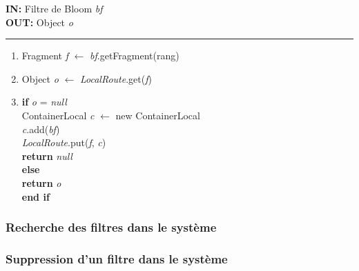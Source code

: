 \documentclass[a4paper,11pt]{report}
\begin{document}
\begin{flushleft}
	\begin{framed}
		\textbf{IN:} Filtre de Bloom \textit{bf}\\
		\textbf{OUT:} Object \textit{o}\\
		\noindent\rule{\linewidth}{0.5pt}

		\begin{enumerate}
			\item Fragment \textit{f} $\leftarrow$ \textit{bf}.getFragment(rang)
			\item Object \textit{o} $\leftarrow$ \textit{LocalRoute}.get(\textit{f})
			\item 
				\begin{tabbing}
					\textbf{if }\= \textit{o} = \textit{null}\\
						\> ContainerLocal \textit{c} $\leftarrow$ new ContainerLocal\\
						\> \textit{c}.add(\textit{bf})\\
						\> \textit{LocalRoute}.put(\textit{f}, \textit{c})\\
						\> \textbf{return} \textit{null}\\
					\textbf{else}\\
						\> \textbf{return} \textit{o}\\
					\textbf{end if} 
				\end{tabbing}
		\end{enumerate}	
	\end{framed}
\end{flushleft}


\subsubsection{Recherche des filtres dans le système}
		
	

\subsubsection{Suppression d'un filtre dans le système}
	
\end{document}
